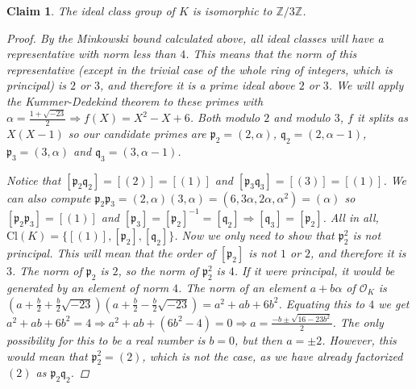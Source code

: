 \documentclass[11pt]{article}
\newtheorem{claim}[theorem]{Claim}
\theoremstyle{definition}
\begin{document}
    \begin{claim}
        The ideal class group of $K$ is isomorphic to $\mathbb{Z}/3\mathbb{Z}$.

        \begin{proof}
            By the Minkowski bound calculated above, all ideal classes will have a representative with norm less than $4$.
            This means that the norm of this representative (except in the trivial case of the whole ring of integers, which is principal) is
            $2$ or $3$, and therefore it is a prime ideal above $2$ or $3$.
            We will apply the Kummer-Dedekind theorem to these primes with $\alpha = \frac{1+\sqrt {-23}}{2} \Rightarrow f(X) = X^2 - X + 6$.
            Both modulo $2$ and modulo $3$, $f$ it splits as $X(X-1)$ so our candidate primes are $\mathfrak{p}_2 = (2, \alpha)$, $\mathfrak{q}_2 = (2, \alpha - 1)$,
            $\mathfrak{p}_3 = (3, \alpha)$ and $\mathfrak{q}_3 = (3, \alpha - 1)$.\linebreak

            \noindent Notice that $[\mathfrak{p}_2 \mathfrak{q}_2] = [(2)] = [(1)]$ and $[\mathfrak{p}_3 \mathfrak{q}_3] = [(3)] = [(1)]$.
            We can also compute $\mathfrak{p}_2\mathfrak{p}_3 = (2, \alpha)(3, \alpha) = (6, 3\alpha, 2\alpha, \alpha^2) = (\alpha)$
            so $[\mathfrak{p}_2\mathfrak{p}_3] = [(1)]$ and
            $[\mathfrak{p}_3] = [\mathfrak{p}_2]^{-1} = [\mathfrak{q}_2] \Rightarrow [\mathfrak{q}_3] = [\mathfrak{p_2}]$.
            All in all, $\text{Cl}(K) = \{[(1)], [\mathfrak{p}_2], [\mathfrak{q}_2]\}$.
            Now we only need to show that $\mathfrak{p}_2^2$ is not principal.
            This will mean that the order of $[\mathfrak{p}_2]$ is not $1$ or $2$, and therefore it is $3$.
            The norm of $\mathfrak{p}_2$ is $2$, so the norm of $\mathfrak{p}_2^2$ is $4$.
            If it were principal, it would be generated by an element of norm $4$.
            The norm of an element $a + b \alpha$ of $\mathcal{O}_K$ is
            $\left(a + \frac{b}{2} + \frac{b}{2}\sqrt{-23}\right)\left(a + \frac{b}{2} - \frac{b}{2}\sqrt{-23}\right) = a^2 + ab + 6b^2$.
            Equating this to $4$ we get $a^2 + ab + 6b^2 = 4 \Rightarrow a^2 + ab + (6b^2 - 4) = 0 \Rightarrow a = \frac{-b \pm \sqrt{16 - 23b^2}}{2}$.
            The only possibility for this to be a real number is $b = 0$, but then $a = \pm 2$.
            However, this would mean that $\mathfrak{p}_2^2 = (2)$, which is not the case, as we have already factorized $(2)$ as $\mathfrak{p}_2\mathfrak{q}_2$.

        \end{proof}

    \end{claim}
\end{document}
